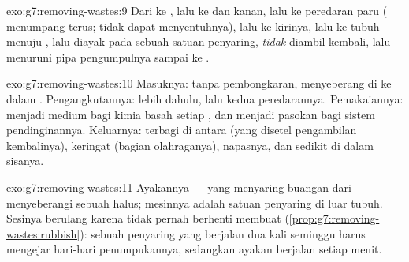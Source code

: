 \begin{solution}{exo:g7:removing-wastes:9}
Dari   ke , lalu ke  dan  kanan, lalu ke
peredaran paru ( menumpang terus;  tidak dapat
menyentuhnya), lalu ke  kirinya, lalu ke  tubuh menuju
, lalu diayak pada sebuah satuan penyaring, \emph{tidak}
diambil kembali, lalu menuruni pipa pengumpulnya sampai ke .
\end{solution}

\begin{solution}{exo:g7:removing-wastes:10}
Masuknya: tanpa pembongkaran, menyeberang di  ke dalam
. Pengangkutannya:  lebih dahulu, lalu kedua
peredarannya. Pemakaiannya: menjadi medium bagi kimia basah setiap
, dan menjadi pasokan bagi sistem pendinginannya. Keluarnya:
terbagi di antara  (yang disetel pengambilan kembalinya),
keringat (bagian olahraganya),  napasnya, dan sedikit di
dalam sisanya.
\end{solution}

\begin{solution}{exo:g7:removing-wastes:11}
Ayakannya --- yang menyaring buangan dari  menyeberangi sebuah
 halus; mesinnya adalah satuan penyaring di luar tubuh. Sesinya
berulang karena  tidak pernah berhenti membuat 
(\cref{prop:g7:removing-wastes:rubbish}): sebuah penyaring yang
berjalan dua kali seminggu harus mengejar hari-hari penumpukannya,
sedangkan ayakan  berjalan setiap menit.
\end{solution}


